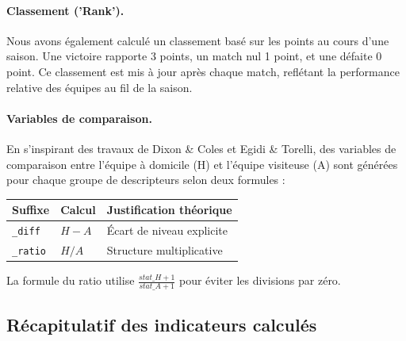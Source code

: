 \paragraph{Classement ('Rank').}
Nous avons également calculé un classement basé sur les points au cours d'une saison.
Une victoire rapporte 3 points, un match nul 1 point, et une défaite 0 point.
Ce classement est mis à jour après chaque match, reflétant la performance relative des équipes au fil de la saison.

\paragraph{Variables de comparaison.}
En s'inspirant des travaux de Dixon \& Coles\cite{dixon} et Egidi \&
Torelli\cite{egidi}, des variables de comparaison entre l'équipe à domicile
(H) et l'équipe visiteuse (A) sont générées pour chaque groupe de descripteurs selon deux formules :

\begin{center}
    \begin{tabular}{lll}
        \toprule
        \textbf{Suffixe} & \textbf{Calcul} & \textbf{Justification théorique}           \\
        \midrule
        \texttt{\_diff}  & $H - A$         & Écart de niveau explicite \cite{egidi} \\
        \texttt{\_ratio} & $H / A$         & Structure multiplicative \cite{dixon}  \\
        \bottomrule
    \end{tabular}
\end{center}

La formule du ratio utilise $\frac{stat\_H + 1}{stat\_A +1}$ pour éviter les 
divisions par zéro.

\subsection{Récapitulatif des indicateurs calculés}

